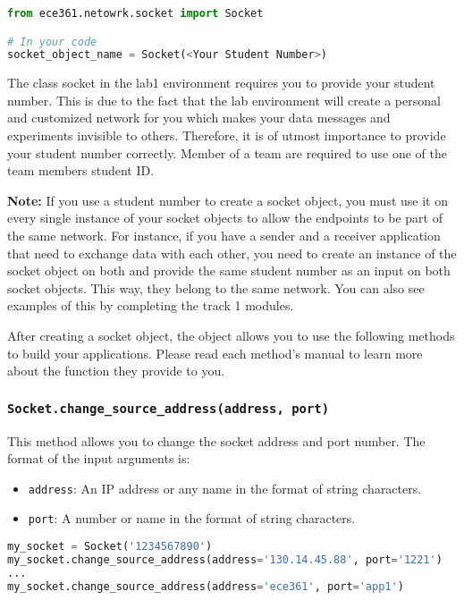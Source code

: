 \documentclass[11pt]{article}
\begin{document}
\begin{lstlisting}[caption={Importing the \texttt{Socket} class}, language=Python]
from ece361.netowrk.socket import Socket

# In your code
socket_object_name = Socket(<Your Student Number>)
\end{lstlisting}

The class socket in the lab1 environment requires you to provide your student number. This is due to the fact that the lab environment will create a personal and customized network for you which makes your data messages and experiments invisible to others. Therefore, it is of utmost importance to provide your student number correctly. Member of a team are required to use one of the team members student ID.

\textbf{Note:}
If you use a student number to create a socket object, you must use it on every single instance of your socket objects to allow the endpoints to be part of the same network. For instance, if you have a sender and a receiver application that need to exchange data with each other, you need to create an instance of the socket object on both and provide the same student number as an input on both socket objects. This way, they belong to the same network. You can also see examples of this by completing the track 1 modules.

After creating a socket object, the object allows you to use the following methods to build your applications. Please read each method's manual to learn more about the function they provide to you.

\subsubsection{\texttt{Socket.change\_source\_address(address, port)}}
This method allows you to change the socket address and port number. The format of the input arguments is:
\begin{itemize}
    \item \texttt{address}: An IP address or any name in the format of string characters.
    \item \texttt{port}: A number or name in the format of string characters.
\end{itemize}

\begin{lstlisting}[caption={Example for using \texttt{change\_source\_address()}}, language=Python]
my_socket = Socket('1234567890')
my_socket.change_source_address(address='130.14.45.88', port='1221')
...
my_socket.change_source_address(address='ece361', port='app1')
\end{lstlisting}
\end{document}
